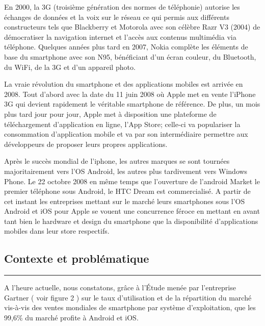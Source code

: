 \documentclass[11]{article}
\begin{document}
 \vspace{0.5cm}
 
En 2000, la 3G (troisième génération des normes de téléphonie) autorise les échanges de données et la voix sur le réseau ce qui permis aux différents constructeurs tels que Blackberry et Motorola avec son célèbre Razr V3 (2004) de démocratiser la navigation internet et l’accès aux contenus multimédia via téléphone. Quelques années plus tard en 2007, Nokia complète les éléments de base du smartphone avec son N95, bénéficiant d’un écran couleur, du Bluetooth, du WiFi, de la 3G et d’un appareil photo.

 \vspace{0.5cm}
 
La vraie révolution du smartphone et des applications mobiles est arrivée en 2008. Tout d’abord avec la date du 11 juin 2008 où Apple met en vente l’iPhone 3G qui devient rapidement le véritable smartphone de référence. De plus, un mois plus tard jour pour jour, Apple met à disposition une plateforme de téléchargement d’application en ligne, l’App Store; celle-ci va populariser la consommation d’application mobile et va par son intermédiaire permettre aux développeurs de proposer leurs propres applications.

 \vspace{0.5cm}
 
Après le succès mondial de l’iphone, les autres marques se sont tournées majoritairement vers l’OS Android, les autres plus tardivement vers Windows Phone. Le 22 octobre 2008 en même temps que l’ouverture de l’android Market le premier téléphone sous Android, le HTC Dream est commercialisé. A partir de cet instant les entreprises mettant sur le marché leurs smartphones sous l’OS Android et iOS pour Apple se vouent une concurrence féroce en mettant en avant tant bien le hardware et design du smartphone que la disponibilité d’applications mobiles dans leur store respectifs.
 
 
\newpage
\thispagestyle{empty}
\begin{center}
\part{Contexte et problématique}
\noindent\rule{12cm}{0.4pt}
\end{center}

A l’heure actuelle, nous constatons, grâce à l'Étude menée par l’entreprise Gartner ( voir figure 2 ) sur le taux d’utilisation et de la répartition du marché vis-à-vis des ventes mondiales de smartphone par système d’exploitation, que les 99,6\% du marché profite à Android et iOS. 
\end{document}
